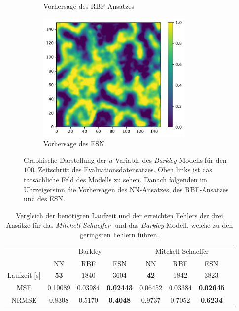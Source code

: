 \begin{figure}[h]
\begin{subfigure}{.5\textwidth}
		\setcapmargin[1cm]{0.5cm}
  		\caption{Vorhersage des \textsc{RBF}-Ansatzes}
  		\label{fig:exp_unblur_barkley_result_rbf_pred}
	\end{subfigure}%
	\begin{subfigure}{.5\textwidth}
		\centering
		\includegraphics[height=2.5in]{figures/results/unblur/esn_barkley_u_blur_pred.pdf}
		\setcapmargin[1cm]{0.5cm}
  		\caption{Vorhersage des \textsc{ESN}}
  		\label{fig:exp_unblur_barkley_result_esn_pred}
	\end{subfigure}
	\caption{Graphische Darstellung der $u$-Variable des \textit{Barkley}-Modells für den $100$. Zeitschritt des Evaluationsdatensatzes. Oben links ist das tatsächliche Feld des Modells zu sehen. Danach folgenden im Uhrzeigersinn die Vorhersagen des \textsc{NN}-Ansatzes, des \textsc{RBF}-Ansatzes und des \textsc{ESN}.}
	\label{fig:exp_unblur_barkley_result}
\end{figure} 

\begin{table}[h]
	\centering
	\captionsetup{width=0.9\linewidth}
	\begin{tabular}{cccccccc}
		\hline
		\multicolumn{1}{c}{} & \multicolumn{3}{c}{Barkley} & \multicolumn{3}{c}{Mitchell-Schaeffer}		\\
		\multicolumn{1}{c}{} & NN & RBF & ESN & NN & RBF & ESN \\
		
		\hline
		
		Laufzeit [s] 	& \textbf{53} 	& 1840		& 3604				& \textbf{42}	& 1842 		& 3823 \\
		MSE 			& 0.10089		& 0.03984	& \textbf{0.02443} 	& 0.06452		& 0.03384 	& \textbf{0.02645} \\
		NRMSE 			& 0.8308		& 0.5170	& \textbf{0.4048} 	& 0.9737		& 0.7052 	& \textbf{0.6234} \\
		\hline 
	\end{tabular} 
	\caption{Vergleich der benötigten Laufzeit und der erreichten Fehlers der drei Ansätze für das \textit{Mitchell-Schaeffer}- und das \textit{Barkley}-Modell, welche zu den geringsten Fehlern führen.}
	\label{tab:exp_unblur_comparison_results}
\end{table}

\FloatBarrier